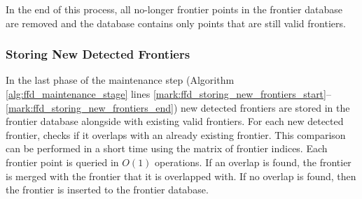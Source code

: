 	In the end of this process, all no-longer frontier points in the frontier
	database are removed and the database contains only points that are still valid
	frontiers. 
	
	\subsubsection{Storing New Detected Frontiers}
	\label{section:storing_frontiers}	
	In the last phase of the maintenance step (Algorithm
	\ref{alg:ffd_maintenance_stage} lines
	\ref{mark:ffd_storing_new_frontiers_start}--\ref{mark:ffd_storing_new_frontiers_end})
	new detected frontiers are stored in the frontier database alongside with
	existing valid frontiers.  For each new detected frontier, \FFD checks if it
	overlaps with an already existing frontier. This comparison can be performed
	in a short time using the matrix of frontier indices. Each frontier point is
	queried in $O(1)$ operations. If an overlap is found, the frontier is merged
	with the frontier that it is overlapped with. If no overlap is found, then the
	frontier is inserted to the frontier database.
	
	
	

%  



